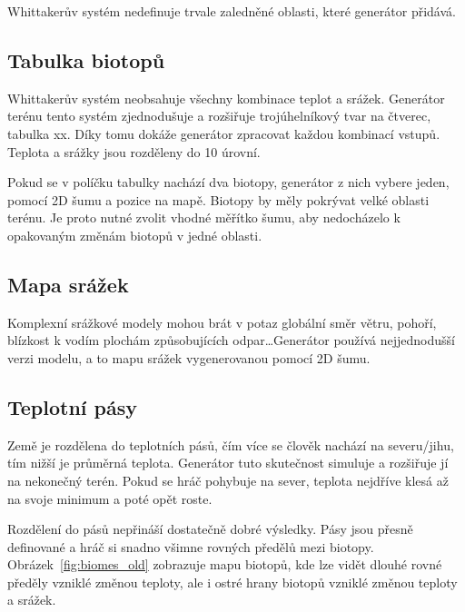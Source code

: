 \documentclass[thesis=M,czech]{FITthesis}[2019/12/23]
\begin{document}
Whittakerův systém nedefinuje trvale zaledněné oblasti, které generátor přidává.

\subsection{Tabulka biotopů}
Whittakerův systém neobsahuje všechny kombinace teplot a srážek. Generátor terénu tento systém zjednodušuje a rozšiřuje trojúhelníkový tvar na čtverec, tabulka xx. Díky tomu dokáže generátor zpracovat každou kombinací vstupů. Teplota a srážky jsou rozděleny do 10 úrovní.


Pokud se v políčku tabulky nachází dva biotopy, generátor z nich vybere jeden, pomocí 2D šumu a pozice na mapě. Biotopy by měly pokrývat velké oblasti terénu. Je proto nutné zvolit vhodné měřítko šumu, aby nedocházelo k opakovaným změnám biotopů v jedné oblasti.

\subsection{Mapa srážek}

Komplexní srážkové modely mohou brát v potaz globální směr větru, pohoří, blízkost k vodím plochám způsobujících odpar\dots Generátor používá nejjednodušší verzi modelu, a to mapu srážek vygenerovanou pomocí 2D šumu.

\subsection{Teplotní pásy}

Země je rozdělena do teplotních pásů, čím více se člověk nachází na severu/jihu, tím nižší je průměrná teplota. Generátor tuto skutečnost simuluje a rozšiřuje jí na nekonečný terén. Pokud se hráč pohybuje na sever, teplota nejdříve klesá až na svoje minimum a poté opět roste.

Rozdělení do pásů nepřináší dostatečně dobré výsledky. Pásy jsou přesně definované a hráč si snadno všimne rovných předělů mezi biotopy. Obrázek~\ref{fig:biomes_old} zobrazuje mapu biotopů, kde lze vidět dlouhé rovné předěly vzniklé změnou teploty, ale i ostré hrany biotopů vzniklé změnou teploty a srážek.

\end{document}
